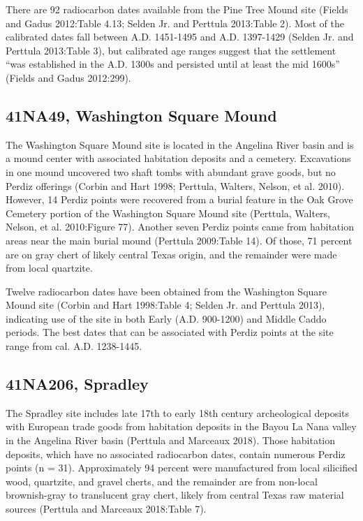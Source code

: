 \documentclass[review]{elsarticle}
\begin{document}
There are 92 radiocarbon dates available from the Pine Tree Mound site (Fields and Gadus 2012:Table 4.13; Selden Jr. and Perttula 2013:Table 2). Most of the calibrated dates fall between A.D. 1451-1495 and A.D. 1397-1429 (Selden Jr. and Perttula 2013:Table 3), but calibrated age ranges suggest that the settlement “was established in the A.D. 1300s and persisted until at least the mid 1600s” (Fields and Gadus 2012:299).

\subsection*{41NA49, Washington Square Mound}

The Washington Square Mound site is located in the Angelina River basin and is a mound center with associated habitation deposits and a cemetery. Excavations in one mound uncovered two shaft tombs with abundant grave goods, but no Perdiz offerings (Corbin and Hart 1998; Perttula, Walters, Nelson, et al. 2010). However, 14 Perdiz points were recovered from a burial feature in the Oak Grove Cemetery portion of the Washington Square Mound site (Perttula, Walters, Nelson, et al. 2010:Figure 77). Another seven Perdiz points came from habitation areas near the main burial mound  (Perttula 2009:Table 14). Of those, 71 percent are on gray chert of likely central Texas origin, and the remainder were made from local quartzite.

Twelve radiocarbon dates have been obtained from the Washington Square Mound site (Corbin and Hart 1998:Table 4; Selden Jr. and Perttula 2013), indicating use of the site in both Early (A.D. 900-1200) and Middle Caddo periods. The best dates that can be associated with Perdiz points at the site range from cal. A.D. 1238-1445.

\subsection*{41NA206, Spradley}

The Spradley site includes late 17th to early 18th century archeological deposits with European trade goods from habitation deposits in the Bayou La Nana valley in the Angelina River basin (Perttula and Marceaux 2018). Those habitation deposits, which have no associated radiocarbon dates, contain numerous Perdiz points (n = 31). Approximately 94 percent were manufactured from local silicified wood, quartzite, and gravel cherts, and the remainder are from non-local brownish-gray to translucent gray chert, likely from central Texas raw material sources (Perttula and Marceaux 2018:Table 7).
\end{document}
